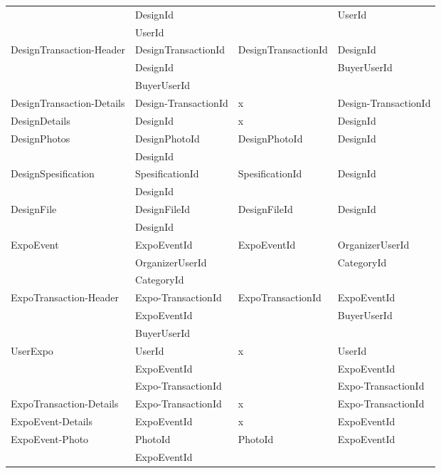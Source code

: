 \begin{longtable}{| p{3cm} | p{3.2cm} | l | p{3.2cm} |}
									& DesignId				& 						& UserId				\\
									& UserId				&						&						\\ \hline
		DesignTransaction-Header		& DesignTransactionId	& DesignTransactionId	& DesignId				\\
									& DesignId				&						& BuyerUserId			\\
									& BuyerUserId			&						&						\\ \hline
		DesignTransaction-Details	& Design-TransactionId	& x						& Design-TransactionId	\\ \hline
		DesignDetails				& DesignId				& x						& DesignId				\\ \hline
		DesignPhotos				& DesignPhotoId			& DesignPhotoId			& DesignId				\\
									& DesignId				&						& 						\\ \hline
		DesignSpesification			& SpesificationId		& SpesificationId		& DesignId				\\
									& DesignId				&						&						\\ \hline
		DesignFile					& DesignFileId			& DesignFileId			& DesignId				\\
									& DesignId				&						&						\\ \hline
		ExpoEvent					& ExpoEventId			& ExpoEventId			& OrganizerUserId		\\
									& OrganizerUserId		&						& CategoryId			\\
									& CategoryId			&						&						\\ \hline
		ExpoTransaction-Header		& Expo-TransactionId		& ExpoTransactionId		& ExpoEventId			\\
									& ExpoEventId			&						& BuyerUserId			\\
									& BuyerUserId			&						&						\\ \hline
		UserExpo					& UserId				& x						& UserId				\\
									& ExpoEventId			&						& ExpoEventId			\\
									& Expo-TransactionId		&						& Expo-TransactionId		\\ \hline
		ExpoTransaction-Details		& Expo-TransactionId		& x						& Expo-TransactionId		\\ \hline
		ExpoEvent-Details			& ExpoEventId			& x						& ExpoEventId			\\ \hline
		ExpoEvent-Photo				& PhotoId				& PhotoId				& ExpoEventId			\\
									& ExpoEventId			&						& 						\\ \hline

\end{longtable}
